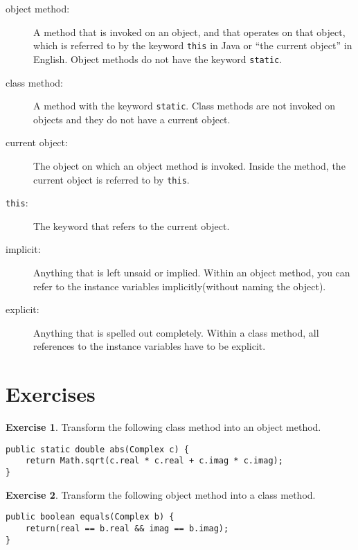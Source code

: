 \documentclass[12pt]{book}
\theoremstyle{definition}
\newtheorem{excz}{Exercise}[chapter]
\newenvironment{exercise}{\bigskip\begin{excz}\mbox{}}{\end{excz}}
\begin{document}
\begin{description}

\item[object method:]  A method that is invoked on an object,
and that operates on that object, which is referred to by
the keyword {\tt this} in Java or ``the current object'' in
English.  Object methods do not have the keyword {\tt static}.

\item[class method:]  A method with the keyword {\tt static}.
Class methods are not invoked on objects and they do not have
a current object.

\item[current object:]  The object on which an object method
is invoked.  Inside the method,
the current object is referred to by {\tt this}.

\item[{\tt this}:]  The keyword that refers to the current object.

\item[implicit:]  Anything that is left unsaid or implied.  Within
an object method, you can refer to the instance variables
implicitly(without naming the object).

\item[explicit:]  Anything that is spelled out completely.  Within
a class method, all references to the instance variables have to
be explicit.


\end{description}


\section{Exercises}

\begin{exercise}

Transform the following class method into an object method.

\begin{lstlisting}
public static double abs(Complex c) {
    return Math.sqrt(c.real * c.real + c.imag * c.imag);
} 
\end{lstlisting}
\end{exercise}


\begin{exercise}
Transform the following object method into a class method.

\begin{lstlisting}
public boolean equals(Complex b) {
    return(real == b.real && imag == b.imag);
}
\end{lstlisting}
\end{exercise}
\end{document}
